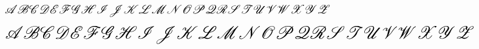 \documentclass[11pt]{article}
\begin{document}
    $\mathlarger{\mathlarger{\mathlarger{\mathscr{ABCDEFGHIJKLMNOPQRSTUVWXYZ}}}}$


    $ \text{\huge$\mathscr{ABCDEFGHIJKLMNOPQRSTUVWXYZ}$} $
\end{document}
